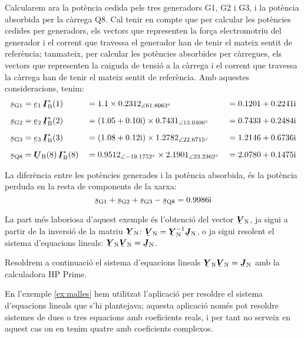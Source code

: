 \begin{exemple}
    Calcularem ara la potència cedida pels tres generadors G1, G2 i G3, i la potència absorbida per la càrrega Q8. Cal tenir en compte que per calcular les potències cedides per generadors, els vectors que representen la força electromotriu del generador i el corrent que travessa el generador han de tenir el mateix sentit de referència; tanmateix, per calcular les potències absorbides per càrregues, els vectors que representen la caiguda de tensió a la càrrega i el corrent que travessa la càrrega han de tenir el mateix sentit de referència. Amb aquestes consideracions, tenim:
    \begin{alignat*}{3}
       \cmplx{s}\ped{G1} &= \cmplx{e}\ped{1} \, \mcmplx{I}\ped{B}^*(1) &&= \num{1,1} \times
        \numpd{0,2312}{61,8063} &&= \complexnum{0,1201 + j 0,2241} \\[2mm]
       \cmplx{s}\ped{G2} &= \cmplx{e}\ped{2} \, \mcmplx{I}\ped{B}^*(2) &&=
       (\complexnum{1,05 + j 0,10}) \times \numpd{0,7431}{13,0406} &&=
       \complexnum{0,7433 + j 0,2484} \\[2mm]
       \cmplx{s}\ped{G3} &= \cmplx{e}\ped{3} \, \mcmplx{I}\ped{B}^*(3) &&=
       (\complexnum{1,08 + j 0,12}) \times \numpd{1,2782}{22,6715} &&=
       \complexnum{1,2146 + j 0,6736}  \\[2mm]
       \cmplx{s}\ped{Q8} &= \mcmplx{U}\ped{B}(8) \, \mcmplx{I}\ped{B}^*(8) &&=
      \numpd{0,9512}{-19,1752} \times \numpd{2,1901}{23,2362}    &&=
      \complexnum{2,0780 + j 0,1475}
    \end{alignat*}

    La diferència entre les potències generades i la potència absorbida, és la potència perduda en la resta de components de la xarxa:
    \[
       \cmplx{s}\ped{G1} + \cmplx{s}\ped{G2} + \cmplx{s}\ped{G3} -
       \cmplx{s}\ped{Q8} = \complexnum{j 0,9986}
    \]

    La part més laboriosa d'aquest exemple és l'obtenció del vector $\mcmplx{V}\ped{N}$, ja sigui a partir de la inversió de la matriu $\mcmplx{Y}\ped{N}$: $\mcmplx{V}\ped{N} = \mcmplx{Y}\ped{N}^{-1} \mcmplx{J}\ped{N}$, o ja sigui  resolent el sistema d'equacions lineals: $\mcmplx{Y}\ped{N}  \mcmplx{V}\ped{N} = \mcmplx{J}\ped{N}$.

    Resoldrem a continuació el sistema d'equacions lineals $\mcmplx{Y}\ped{N} \mcmplx{V}\ped{N} = \mcmplx{J}\ped{N}$ amb la calculadora \textsf{HP Prime}.

    En l'exemple \vref{ex:malles} hem utilitzat l'aplicació  per resoldre el sistema d'equacions lineals que s'hi plantejava;  aquesta aplicació només pot resoldre sistemes de dues o tres equacions amb coeficients reals, i per tant no serveix en aquest cas on en tenim quatre amb coeficients complexos.


\end{exemple}
